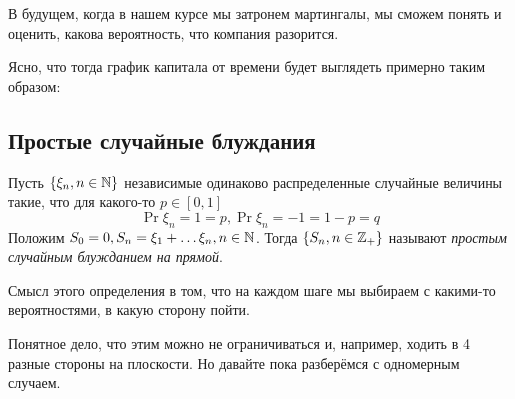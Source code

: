 \begin{example}
  В будущем, когда в нашем курсе мы затронем мартингалы, мы сможем понять и
  оценить, какова вероятность, что компания разорится.

  Ясно, что тогда график капитала от времени будет выглядеть примерно 
  таким образом:


\begin{center}
\end{center}
\end{example}

\subsection{Простые случайные блуждания}

\begin{definition}
  Пусть $\{\xi_n, n \in \mathbb{N}\}$ независимые одинаково распределенные случайные
  величины такие, что для какого-то $p \in [0, 1]$
  \[
    \Pr{\xi_n = 1} = p, \Pr{\xi_n = -1} = 1 - p = q
  \]
  Положим $S_0 = 0, S_n = \xi_1 + \ldots \xi_n,
  n \in \mathbb{N}$. Тогда $\{S_n, n \in \mathbb{Z}_{+}\}$ называют \emph{простым случайным
  блужданием на прямой}.
\end{definition}

Смысл этого определения в том, что на каждом шаге мы выбираем с какими-то вероятностями, в какую сторону пойти.

Понятное дело, что этим можно не ограничиваться и, например, ходить в 4 разные
стороны на плоскости. Но давайте пока разберёмся с одномерным случаем.

